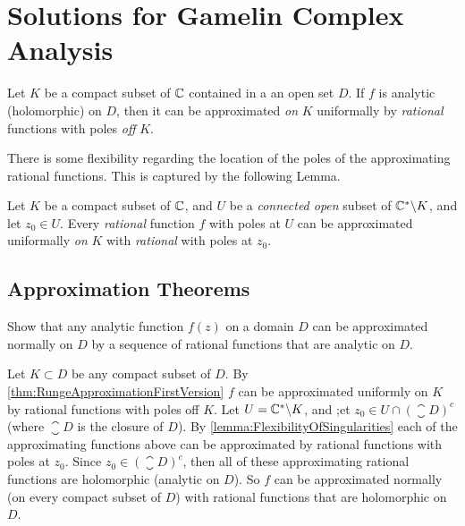 \chapter{Solutions for Gamelin Complex Analysis}


\begin{theorem}
	\label{thm:RungeApproximationFirstVersion}
	Let $ K $ be a compact subset of $ \mathbb{C} $ contained in a an open set $ D $. If $ f $ is analytic (holomorphic) on $ D $, then it can be approximated \emph{on} $ K $ uniformally by \emph{rational} functions with poles \emph{off} $ K $.
\end{theorem}

There is some flexibility regarding the location of the poles of the approximating rational functions. This is captured by the following Lemma.

\begin{lemma}
	\label{lemma:FlexibilityOfSingularities}
	Let $ K $ be a compact subset of $ \mathbb{C} $, and $ U $ be a \emph{connected open} subset of $ \mathbb{C}^* \backslash K $, and let $ z_0 \in U $. Every \emph{rational} function $ f $ with poles at $ U $ can be approximated uniformally \emph{on} $ K $ with \emph{rational} with poles at $ z_0 $. 
\end{lemma}


\section{Approximation Theorems}
\begin{problem}
	Show that any analytic function $ f(z) $ on a domain $ D $ can be approximated normally on $ D $ by a sequence of rational functions that are analytic on $ D $.
\end{problem}
\begin{solution}
	Let $ K \subset D $ be any compact subset of $ D $. By \autoref{thm:RungeApproximationFirstVersion} $ f $ can be approximated uniformly on $ K $ by rational functions with poles off $ K $. Let $ U = \mathbb{C}^*\backslash K $, and ;et $ z_0 \in U\cap (\closure{D})^c $ (where $ \closure{D} $ is the closure of $ D $). By \autoref{lemma:FlexibilityOfSingularities} each of the approximating functions above can be approximated by rational functions with poles at $ z_0 $. Since $ z_0 \in (\closure{D})^c $, then all of these approximating rational functions are holomorphic (analytic on $ D $). So $ f $ can be approximated normally (on every compact subset of $ D $) with rational functions that are holomorphic on $ D $.
\end{solution}

